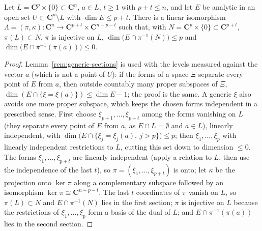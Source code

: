\begin{lemma}
\label{rem:flat-coordinates}
\leanok
Let \(L=\mathbf C^p\times\{0\}\subset\mathbf C^n\), \(a\in L\), \(t\ge1\) with \(p+t\le n\), and let \(E\) be analytic in an open set \(U\subset\mathbf C^n\setminus L\)
with \(\dim E\le p+t\). There is a linear isomorphism \(\Lambda=(\pi,\kappa)\colon\mathbf C^n\to\mathbf C^{p+t}\times\mathbf C^{n-p-t}\) such that, with
\(N=\mathbf C^p\times\{0\}\subset\mathbf C^{p+t}\), \(\pi(L)\subset N\), \(\pi\) is injective on \(L\), \(\dim\bigl(E\cap\pi^{-1}(N)\bigr)\le p\) and
\(\dim\bigl(E\cap\pi^{-1}(\pi(a))\bigr)\le0\).
\end{lemma}
\begin{proof}
\leanok
Lemma~\ref{rem:generic-sections} is used with the levels measured against the vector \(a\) (which is not a point of \(U\)): if the forms of a space
\(\Xi\) separate every point of \(E\) from \(a\), then outside countably many proper subspaces of \(\Xi\), \(\dim(E\cap\{\xi=\xi(a)\})\le\dim E-1\); the
proof is the same. A generic \(\xi\) also avoids one more proper subspace, which keeps the chosen forms independent in a prescribed sense.
First choose \(\xi_{p+1},\dots,\xi_{p+t}\) among the forms vanishing on \(L\) (they separate every point of \(E\) from \(a\), as \(E\cap L=\emptyset\) and
\(a\in L\)), linearly independent, with \(\dim\bigl(E\cap\{\xi_j=\xi_j(a),\ j>p\}\bigr)\le p\); then \(\xi_1,\dots,\xi_p\) with linearly independent
restrictions to \(L\), cutting this set down to dimension \(\le0\). The forms \(\xi_1,\dots,\xi_{p+t}\) are linearly independent (apply a relation to
\(L\), then use the independence of the last \(t\)), so \(\pi=(\xi_1,\dots,\xi_{p+t})\) is onto; let \(\kappa\) be the projection onto \(\ker\pi\) along a
complementary subspace followed by an isomorphism \(\ker\pi\cong\mathbf C^{n-p-t}\). The last \(t\) coordinates of \(\pi\) vanish on \(L\), so
\(\pi(L)\subset N\) and \(E\cap\pi^{-1}(N)\) lies in the first section; \(\pi\) is injective on \(L\) because the restrictions of \(\xi_1,\dots,\xi_p\)
form a basis of the dual of \(L\); and \(E\cap\pi^{-1}(\pi(a))\) lies in the second section.
\end{proof}

